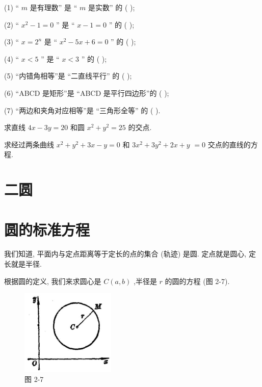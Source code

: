 \documentclass[lang=cn,newtx,10.5pt,scheme=chinese]{elegantbook}
\begin{document}
\begin{problemset}[习 题 四]
(1) “ \(m\) 是有理数” 是 “ \(m\) 是实数” 的 ( );

(2) “ \({x}^{2} - 1 = 0\) ” 是 “ \(x - 1 = 0\) ” 的 ( );

(3) “ \(x = {2}^{n}\) 是 “ \({x}^{2} - {5x} + 6 = 0\) ” 的 ( );

(4) “ \(x < 5\) ” 是 “ \(x < 3\) ” 的 ( );

(5) “内错角相等”是 “二直线平行” 的 ( );

(6) “ABCD 是矩形”是 “ABCD 是平行四边形”的 ( );

(7) “两边和夹角对应相等”是 “三角形全等” 的 ( ).

\item 求直线 \({4x} - {3y} = {20}\) 和圆 \({x}^{2} + {y}^{2} = {25}\) 的交点.

\item 求经过两条曲线 \({x}^{2} + {y}^{2} + {3x} - y = 0\) 和 \(3{x}^{2} + 3{y}^{2} + {2x} + y\) \(= 0\) 交点的直线的方程.
\end{problemset}

\section*{二\text{ }圆}

\section{圆的标准方程}
\begin{definition}[圆] 
我们知道, 平面内与定点距离等于定长的点的集合 (轨迹) 是圆. 定点就是圆心, 定长就是半径.	
\end{definition}
根据圆的定义, 我们来求圆心是 \(C\left( {a,b}\right)\) ,半径是 \(r\) 的圆的方程 (图 2-7).

\begin{figure}[h]
  \centering
  \includegraphics[max width=0.4\textwidth]{images/01912cc2-ffb6-728e-9ae7-b113ff05c64b_77_682858.jpg}
  \caption{图 2-7}
\end{figure}
\end{document}
